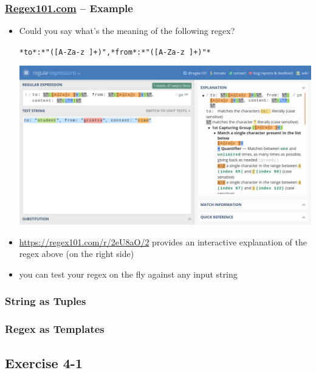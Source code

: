 \documentclass[presentation]{beamer}\mode<presentation>{\usetheme{AMSCesenaPurpleAndGold}}
\begin{document}
\begin{frame}
\frametitle{\href{https://regex101.com/}{Regex101.com} -- Example}

\begin{itemize}
	\item Could you say what's the meaning of the following regex?
	\begin{center}
		\small\alert{
			\texttt{\bs{s}*to*:"([A-Za-z ]+)",\bs{s}*from*:"([A-Za-z ]+)"*}}
	\end{center}
	
	\begin{center}
		\includegraphics[width=.7\linewidth]{./img/regex101.png}
	\end{center}
	
	\item \url{https://regex101.com/r/2eU8aO/2} provides an interactive explanation of the regex above (on the right side) 
	
	\item you can test your regex on the fly against any input string
	
\end{itemize}  
\end{frame}

\begin{frame}
\frametitle{String as Tuples}


%
\end{frame}

\begin{frame}
\frametitle{Regex as Templates}



\end{frame}

\subsection{Exercise 4-1} 
\end{document}
